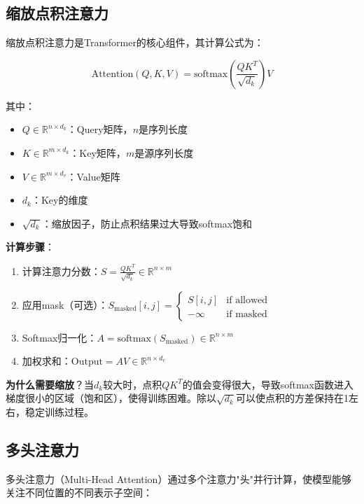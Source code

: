 \documentclass[UTF8,12pt,a4paper]{ctexart}
\begin{document}
\subsection{缩放点积注意力}

缩放点积注意力是Transformer的核心组件，其计算公式为：

\begin{equation}
\text{Attention}(Q, K, V) = \text{softmax}\left(\frac{QK^T}{\sqrt{d_k}}\right)V
\end{equation}

其中：
\begin{itemize}
    \item $Q \in \mathbb{R}^{n \times d_k}$：Query矩阵，$n$是序列长度
    \item $K \in \mathbb{R}^{m \times d_k}$：Key矩阵，$m$是源序列长度
    \item $V \in \mathbb{R}^{m \times d_v}$：Value矩阵
    \item $d_k$：Key的维度
    \item $\sqrt{d_k}$：缩放因子，防止点积结果过大导致softmax饱和
\end{itemize}

\textbf{计算步骤}：

\begin{enumerate}
    \item 计算注意力分数：$S = \frac{QK^T}{\sqrt{d_k}} \in \mathbb{R}^{n \times m}$
    \item 应用mask（可选）：$S_{\text{masked}}[i,j] = \begin{cases} S[i,j] & \text{if allowed} \\ -\infty & \text{if masked} \end{cases}$
    \item Softmax归一化：$A = \text{softmax}(S_{\text{masked}}) \in \mathbb{R}^{n \times m}$
    \item 加权求和：$\text{Output} = AV \in \mathbb{R}^{n \times d_v}$
\end{enumerate}

\textbf{为什么需要缩放}？当$d_k$较大时，点积$QK^T$的值会变得很大，导致softmax函数进入梯度很小的区域（饱和区），使得训练困难。除以$\sqrt{d_k}$可以使点积的方差保持在1左右，稳定训练过程。

\subsection{多头注意力}

多头注意力（Multi-Head Attention）通过多个注意力"头"并行计算，使模型能够关注不同位置的不同表示子空间：
\end{document}
